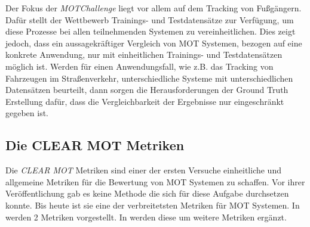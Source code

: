 Der Fokus der \textit{MOTChallenge} liegt vor allem auf dem \gls{Tracking} von Fußgängern. Dafür stellt der Wettbewerb Trainings- und Testdatensätze zur Verfügung, um diese Prozesse bei allen teilnehmenden Systemen zu vereinheitlichen. Dies zeigt jedoch, dass ein aussagekräftiger Vergleich von \gls{MOT} Systemen, bezogen auf eine konkrete Anwendung, nur mit einheitlichen Trainings- und Testdatensätzen möglich ist. Werden für einen Anwendungsfall, wie z.B. das \gls{Tracking} von Fahrzeugen im Straßenverkehr, unterschiedliche Systeme mit unterschiedlichen Datensätzen beurteilt, dann sorgen die Herausforderungen der \gls{Ground Truth} Erstellung dafür, dass die Vergleichbarkeit der Ergebnisse nur eingeschränkt gegeben ist. 

\subsection{Die CLEAR MOT Metriken} \label{sec:MOT MOTA}
Die \textit{\acrshort{CLEAR} \gls{MOT}} Metriken sind einer der ersten Versuche einheitliche und allgemeine Metriken für die Bewertung von \gls{MOT} Systemen zu schaffen. Vor ihrer Veröffentlichung gab es keine Methode die sich für diese Aufgabe durchsetzen konnte. Bis heute ist sie eine der verbreitetsten Metriken für \gls{MOT} Systemen. In \cite{CLEAR.2008} werden 2 Metriken vorgestellt. In \cite{Kasturi.2009} werden diese um weitere Metriken ergänzt. \par

